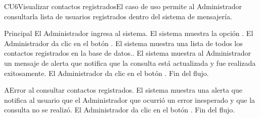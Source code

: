 
% 



	
	\begin{UseCase}{CU6}{Visualizar contactos registrados}{El caso de uso permite al Administrador consultarla lista de usuarios registrados dentro del sistema de mensajer\'ia.
	}
	\end{UseCase}

	\begin{UCtrayectoria}{Principal}
		\UCpaso[\UCactor] El Administrador ingresa al sistema.
		\UCpaso  El sistema muestra la opci\'on .
		\UCpaso[\UCactor] El Administrador da clic en el bot\'on . 
		\UCpaso  El sistema muestra una lista de todos los contactos registrados en la base de datos..
		\UCpaso El sistema muestra al Administrador un mensaje de alerta que notifica que la consulta est\'a actualizada y fue realizada exitosamente.
		\UCpaso[\UCactor] El Administrador da clic en el bot\'on . 	
		\UCpaso[] Fin del flujo.
				
	\end{UCtrayectoria}
		
		\begin{UCtrayectoriaA}{A}{Error al consultar contactos registrados.}
			\UCpaso El sistema muestra una alerta que notifica al usuario que el Administrador que ocurri\'o un error inesperado y que la consulta no se realiz\'o.
			\UCpaso[\UCactor] El Administrador da clic en el bot\'on . 			
			\UCpaso[] Fin del flujo.
		\end{UCtrayectoriaA}		
